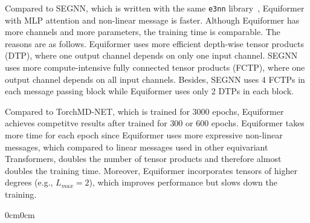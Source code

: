 Compared to SEGNN, which is written with the same \texttt{e3nn} library~\citep{e3nn}, Equiformer with MLP attention and non-linear message is faster.
Although Equiformer has more channels and more parameters, the training time is comparable. 
The reasons are as follows.
Equiformer uses more efficient depth-wise tensor products (DTP), where one output channel depends on only one input channel. 
SEGNN uses more compute-intensive fully connected tensor products (FCTP), where one output channel depends on all input channels. 
Besides, SEGNN uses 4 FCTPs in each message passing block while Equiformer uses only 2 DTPs in each block. 

Compared to TorchMD-NET, which is trained for $3000$ epochs, Equiformer achieves competitve results after trained for $300$ or $600$ epochs.
Equiformer takes more time for each epoch since Equiformer uses more expressive non-linear messages, which compared to linear messages used in other equivariant Transformers, doubles the number of tensor products and therefore almost doubles the training time.
Moreover, Equiformer incorporates tensors of higher degrees (e.g., $L_{max}=2$), which improves performance but slows down the training.



\begin{table}[t]
\begin{adjustwidth}{0cm}{0cm}
\centering
{}
\vspace{-3mm}
\end{adjustwidth}
\caption{\textbf{Comparison of training time and numbers of parameters for QM9 dataset.}  
}
\label{appendix:tab:qm9_training_time}
\end{table}
